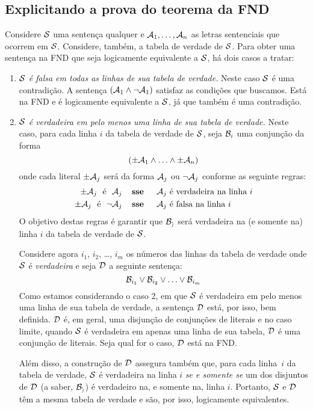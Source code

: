 \subsection{Explicitando a prova do teorema da FND}
Considere  $\mathcal{S}$ uma sentença qualquer e $\mathcal{A}_1, \ldots, \mathcal{A}_n$ as letras sentenciais que ocorrem em $\mathcal{S}$.
Considere, também, a tabela de verdade de $\mathcal{S}$.
Para obter uma sentença na FND que seja logicamente equivalente a $\mathcal{S}$, há dois casos a tratar:
	\begin{enumerate}
		\item \emph{$\mathcal{S}$ é falsa em todas as linhas de sua tabela de verdade.} Neste caso  $\mathcal{S}$ é uma contradição.
		A sentença $(\mathcal{A}_1 \wedge \neg \mathcal{A}_1)$ satisfaz as condições que buscamos.
		Está na FND e é logicamente equivalente a $\mathcal{S}$, já que também é uma contradição.
	
		\item\emph{$\mathcal{S}$ é verdadeira em pelo menos uma linha de sua tabela de verdade.}
		Neste caso, para cada linha $i$ da tabela de verdade de $\mathcal{S}$, seja $\mathcal{B}_i$ uma conjunção da forma
		$$(\pm\mathcal{A}_{1} \land \ldots \land \pm\mathcal{A}_{n})$$
		onde cada literal $\pm\mathcal{A}_{j}$ será da forma $\mathcal{A}_{j}$ ou $\neg\mathcal{A}_{j}$ conforme as seguinte regras:
			\begin{align*}
				\pm\meta{A}_{j}\text{ \ é \ }\meta{A}_{j}&\emph{ \ \ sse \ \ \ }\meta{A}_{j}\text{ é verdadeira na linha }i\\
				\pm\meta{A}_{j}\text{ \ é \ }\enot\meta{A}_{j}&\emph{ \ \ sse \ \ \ }\meta{A}_{j}\text{ é falsa na linha }i
			\end{align*}
		O objetivo destas regras é garantir que  $\mathcal{B_i}$ será verdadeira na (e somente na) linha $i$ da tabela de verdade de $\mathcal{S}$.
		
		Considere agora  $i_1$, $i_2$, \dots, $i_m$ os números das linhas da tabela de verdade onde $\mathcal{S}$ é \emph{verdadeira} e seja $\mathcal{D}$ a seguinte sentença:
		$$\mathcal{B}_{i_1} \vee \mathcal{B}_{i_2} \vee \ldots \vee \mathcal{B}_{i_m}$$
		Como estamos considerando o caso 2, em que $\mathcal{S}$ é verdadeira em pelo menos uma linha de sua tabela de verdade, a sentença $\mathcal{D}$ está, por isso, bem definida.
		$\mathcal{D}$ é, em geral, uma disjunção de conjunções de literais e no caso limite, quando $\mathcal{S}$ é verdadeira em apenas uma linha de sua tabela, $\mathcal{D}$ é uma conjunção de literais.
		Seja qual for o caso, $\mathcal{D}$ está na FND.
		
		Além disso, a construção de $\mathcal{D}$ assegura também que, para cada linha~$i$ da tabela de verdade, $\mathcal{S}$ é verdadeira na linha $i$ \emph{se e somente se} um dos disjuntos de $\mathcal{D}$ (a saber, $\mathcal{B_i}$) é verdadeiro na, e somente na, linha $i$.
		Portanto, $\mathcal{S}$ e $\mathcal{D}$ têm a mesma tabela de verdade e são, por isso, logicamente equivalentes.
	\end{enumerate}
